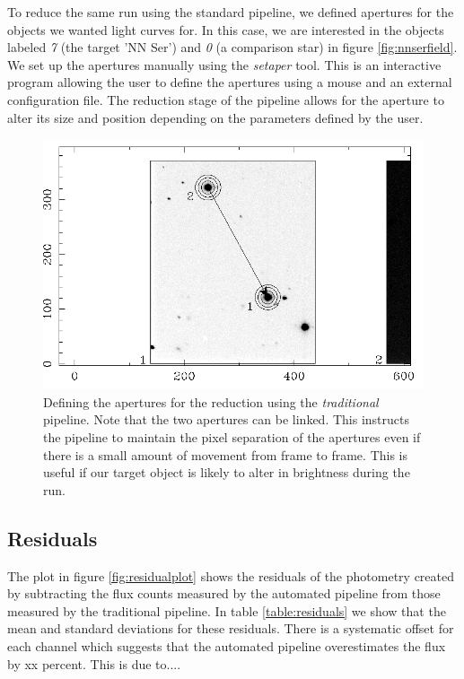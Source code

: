 To reduce the same run using the standard pipeline, we defined apertures for the objects we wanted light curves for. In this case, we are interested in the objects labeled \emph{7} (the target 'NN Ser') and \emph{0} (a comparison star) in figure \ref{fig:nnserfield}. We set up the apertures manually using the \emph{setaper} tool. This is an interactive program allowing the user to define the apertures using a mouse and an external configuration file. The reduction stage of the pipeline allows for the aperture to alter its size and position depending on the parameters defined by the user. 

\begin{figure}[!h]
\centering
\includegraphics[width=140mm]{images/setaper.png}
\caption{Defining the apertures for the reduction using the \emph{traditional} pipeline. Note that the two apertures can be linked. This instructs the pipeline to maintain the pixel separation of the apertures even if there is a small amount of movement from frame to frame. This is useful if our target object is likely to alter in brightness during the run. }
\label{fig:nnsercomparisontom}
\end{figure}


\subsection{Residuals}
The plot in figure \ref{fig:residualplot} shows the residuals of the photometry created by subtracting the flux counts measured by the automated pipeline from those measured by the traditional pipeline. In table \ref{table:residuals} we show that the mean and standard deviations for these residuals. There is a systematic offset for each channel which suggests that the automated pipeline overestimates the flux by xx percent. This is due to.... 

